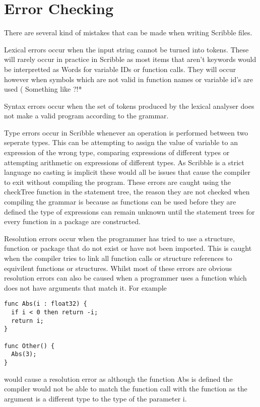 \documentclass[]{final_report}
\begin{document}
\section{Error Checking}

There are several kind of mistakes that can be made when writing Scribble files. 

Lexical errors occur when the input string cannot be turned into tokens. These will rarely occur in practice in Scribble as most items that aren't keywords would be interpretted as Words for variable IDs or function calls. They will occur however when symbols which are not valid in function names or variable id's are used ( Something like ?!*%

Syntax errors occur when the set of tokens produced by the lexical analyser does not make a valid program according to the grammar. 

Type errors occur in Scribble whenever an operation is performed between two seperate types. This can be attempting to assign the value of variable to an expression of the wrong type, comparing expressions of different types or attempting arithmetic on expressions of different types. As Scribble is a strict language no casting is implicit these would all be issues that cause the compiler to exit without compiling the program. These errors are caught using the checkTree function in the statement tree, the reason they are not checked when compiling the grammar is because as functions can be used before they are defined the type of expressions can remain unknown until the statement trees for every function in a package are constructed.

Resolution errors occur when the programmer has tried to use a structure, function or package that do not exist or have not been imported. This is caught when the compiler tries to link all function calls or structure references to equivilent functions or structures. Whilst most of these errors are obvious resolution errors can also be caused when a programmer uses a function which does not have arguments that match it. For example
 
\begin{verbatim}
func Abs(i : float32) {
  if i < 0 then return -i;
  return i;
}

func Other() {
  Abs(3);
}
\end{verbatim}

would cause a resolution error as although the function Abs is defined the compiler would not be able to match the function call with the function as the argument is a different type to the type of the parameter i.
\end{document}
